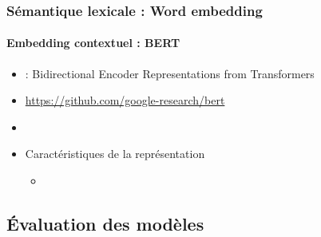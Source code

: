 \documentclass[xcolor=table]{beamer}
\begin{document}
\begin{frame}
\frametitle{Sémantique lexicale : Word embedding}
\framesubtitle{Embedding contextuel : BERT}


\begin{minipage}{.68\textwidth}
	\begin{itemize}
		\item {} : Bidirectional Encoder Representations from Transformers
		\item \url{https://github.com/google-research/bert}
		\item %
		\item Caractéristiques de la représentation
		\begin{itemize}
			\item 
		\end{itemize}
	\end{itemize}
\end{minipage}
\begin{minipage}{.3\textwidth}
\end{minipage}
	
\end{frame}


\subsection{Évaluation des modèles}
\end{document}
